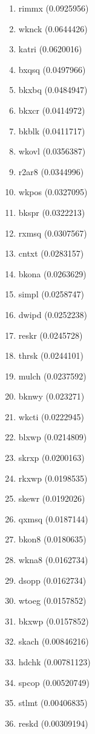 \begin{enumerate}
\item rimmx (0.0925956)
\item wknck (0.0644426)
\item katri (0.0620016)
\item bxqsq (0.0497966)
\item bkxbq (0.0484947)
\item bkxcr (0.0414972)
\item bkblk (0.0411717)
\item wkovl (0.0356387)
\item r2ar8 (0.0344996)
\item wkpos (0.0327095)
\item bkspr (0.0322213)
\item rxmsq (0.0307567)
\item cntxt (0.0283157)
\item bkona (0.0263629)
\item simpl (0.0258747)
\item dwipd (0.0252238)
\item reskr (0.0245728)
\item thrsk (0.0244101)
\item mulch (0.0237592)
\item bknwy (0.023271)
\item wkcti (0.0222945)
\item blxwp (0.0214809)
\item skrxp (0.0200163)
\item rkxwp (0.0198535)
\item skewr (0.0192026)
\item qxmsq (0.0187144)
\item bkon8 (0.0180635)
\item wkna8 (0.0162734)
\item dsopp (0.0162734)
\item wtoeg (0.0157852)
\item bkxwp (0.0157852)
\item skach (0.00846216)
\item hdchk (0.00781123)
\item spcop (0.00520749)
\item stlmt (0.00406835)
\item reskd (0.00309194)
\end{enumerate}